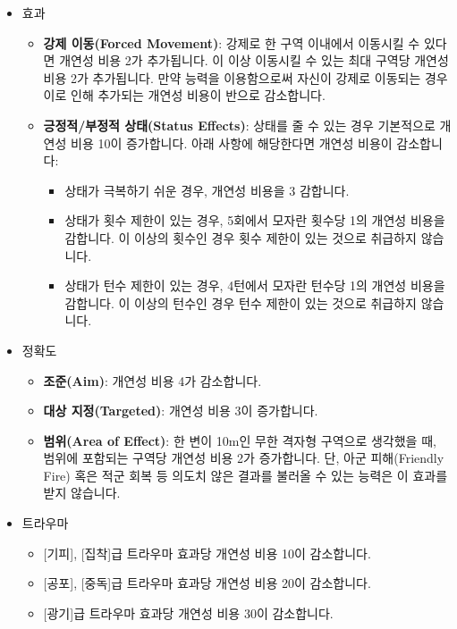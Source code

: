 \documentclass{report}
\begin{document}
\begin{itemize}
		\item 효과
		\begin{itemize}
			\item \textbf{강제 이동(Forced Movement)}: 강제로 한 구역 이내에서 이동시킬 수 있다면 개연성 비용 2가 추가됩니다. 이 이상 이동시킬 수 있는 최대 구역당 개연성 비용 2가 추가됩니다. 만약 능력을 이용함으로써 자신이 강제로 이동되는 경우 이로 인해 추가되는 개연성 비용이 반으로 감소합니다.
			\item \textbf{긍정적/부정적 상태(Status Effects)}: 상태를 줄 수 있는 경우 기본적으로 개연성 비용 10이 증가합니다. 아래 사항에 해당한다면 개연성 비용이 감소합니다:
			\begin{itemize}
				\item 상태가 극복하기 쉬운 경우, 개연성 비용을 3 감합니다.
				\item 상태가 횟수 제한이 있는 경우, 5회에서 모자란 횟수당 1의 개연성 비용을 감합니다. 이 이상의 횟수인 경우 횟수 제한이 있는 것으로 취급하지 않습니다.
				\item 상태가 턴수 제한이 있는 경우, 4턴에서 모자란 턴수당 1의 개연성 비용을 감합니다. 이 이상의 턴수인 경우 턴수 제한이 있는 것으로 취급하지 않습니다.
			\end{itemize}
		\end{itemize}
		
		\item 정확도
		\begin{itemize}
			\item \textbf{조준(Aim)}: 개연성 비용 4가 감소합니다.
			\item \textbf{대상 지정(Targeted)}: 개연성 비용 3이 증가합니다.
			\item \textbf{범위(Area of Effect)}: 한 변이 10m인 무한 격자형 구역으로 생각했을 때, 범위에 포함되는 구역당 개연성 비용 2가 증가합니다. 단, 아군 피해(Friendly Fire) 혹은 적군 회복 등 의도치 않은 결과를 불러올 수 있는 능력은 이 효과를 받지 않습니다.
		\end{itemize}
		
		\item 트라우마
		\begin{itemize}
			\item {}[기피], [집착]급 트라우마 효과당 개연성 비용 10이 감소합니다.
			\item {}[공포], [중독]급 트라우마 효과당 개연성 비용 20이 감소합니다.
			\item {}[광기]급 트라우마 효과당 개연성 비용 30이 감소합니다.
		\end{itemize}
	\end{itemize}
	
\end{document}
